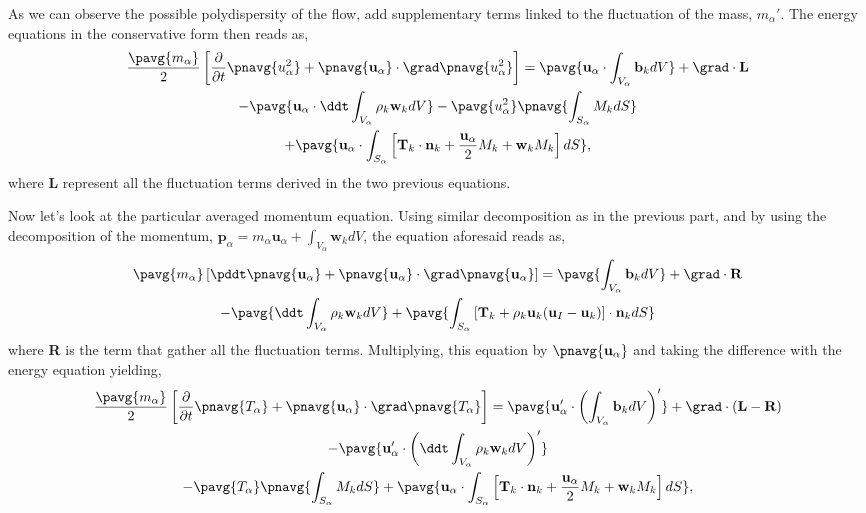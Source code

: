 As we can observe the possible polydispersity of the flow, add supplementary terms linked to the fluctuation of the mass, $m_\alpha'$.
The energy equations in the conservative form then reads as, 
\begin{multline*}
    \frac{\pavg{m_\alpha}}{2}
    \left[
        \frac{\partial }{\partial t}\pnavg{u^2_\alpha}
        + 
        \pnavg{\textbf{u}_\alpha}
        \cdot\grad 
        \pnavg{u^2_\alpha}
    \right]
    = \pavg{\textbf{u}_\alpha \cdot \int_{V_\alpha} \textbf{b}_k dV} + \grad \cdot \textbf{L}\\
    - \pavg{\textbf{u}_\alpha \cdot \ddt \int_{V_\alpha} \rho_k \textbf{w}_k dV} 
    - \pavg{u_\alpha^2}\pnavg{\int_{S_\alpha} M_k d S}\\
    + \pavg{\textbf{u}_\alpha \cdot \int_{S_\alpha} \left[
    \textbf{T}_k \cdot\textbf{n}_k
    +\frac{\textbf{u}_\alpha}{2} M_k
    +\textbf{w}_k M_k
    \right]dS},
\end{multline*}
where \textbf{L} represent all the fluctuation terms derived in the two previous equations. 

Now let's look at the particular averaged momentum equation. 
Using similar decomposition as in the previous part,
and by using the decomposition of the momentum, $\textbf{p}_\alpha = m_\alpha \textbf{u}_\alpha + \int_{V_\alpha} \textbf{w}_k dV$, the equation aforesaid reads as, 
\begin{multline*}
    \pavg{m_\alpha} \left[
        \pddt \pnavg{\textbf{u}_\alpha}
        + \pnavg{\textbf{u}_\alpha}\cdot\grad\pnavg{\textbf{u}_\alpha}
    \right]
    = \pavg{\int_{V_\alpha} \textbf{b}_k dV}
    + \grad \cdot \textbf{R}\\
    - \pavg{\ddt \int_{V_\alpha} \rho_k \textbf{w}_k dV} 
    + \pavg{\int_{S_\alpha} \left[\textbf{T}_k + \rho_k \textbf{u}_k (\textbf{u}_I-\textbf{u}_k) \right] \cdot \textbf{n}_k d S}
\end{multline*}
where \textbf{R} is the term that gather all the fluctuation terms. 
Multiplying, this equation by $\pnavg{\textbf{u}_\alpha}$ and taking the difference with the energy equation yielding, 
\begin{multline*}
    \frac{\pavg{m_\alpha}}{2}
    \left[
        \frac{\partial }{\partial t}\pnavg{T_\alpha}
        + 
        \pnavg{\textbf{u}_\alpha}
        \cdot\grad 
        \pnavg{T_\alpha}
    \right]
    = \pavg{\textbf{u}_\alpha' \cdot \left(\int_{V_\alpha} \textbf{b}_k dV\right)'} 
    + \grad \cdot \left(\textbf{L}-\textbf{R}\right)\\
    - \pavg{\textbf{u}_\alpha' \cdot \left(\ddt \int_{V_\alpha} \rho_k \textbf{w}_k dV\right)'} \\
    - \pavg{T_\alpha}\pnavg{\int_{S_\alpha} M_k d S}
    + \pavg{\textbf{u}_\alpha \cdot \int_{S_\alpha} \left[
    \textbf{T}_k \cdot\textbf{n}_k
    +\frac{\textbf{u}_\alpha}{2} M_k
    +\textbf{w}_k M_k
    \right]dS},
\end{multline*}